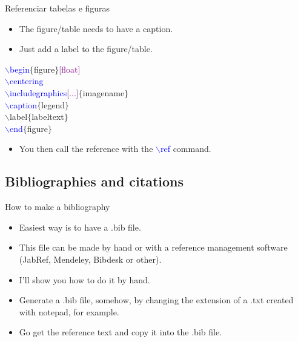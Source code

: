 \documentclass[usenames,dvipsnames,aspectratio=169]{beamer}
\newcommand{\aitem}{\item[$\cdot$]}
\begin{document}

\begin{frame}[t]{Referenciar tabelas e figuras}
\begin{itemize}
\aitem The figure/table needs to have a caption.
\aitem Just add a label to the figure/table.
\end{itemize}
\textcolor{blue}{$\backslash$begin}\textcolor{PineGreen}{$\{$figure$\}$}\textcolor{purple}{[float]}\\
\textcolor{blue}{$\backslash$centering}\\
\textcolor{blue}{$\backslash$includegraphics}\textcolor{purple}{[...]}\textcolor{PineGreen}{$\{$imagename$\}$}\\
\textcolor{blue}{$\backslash$caption}\textcolor{PineGreen}{$\{$legend$\}$}\\
\textcolor{YellowOrange}{$\backslash$label$\{$labeltext$\}$}\\
\textcolor{blue}{$\backslash$end}\textcolor{PineGreen}{$\{$figure$\}$}
\begin{itemize}
\aitem You then call the reference with the \textcolor{blue}{$\backslash$ref} command.
\end{itemize}
\end{frame}


%

\subsection{Bibliographies and citations}
\begin{frame}[t]{How to make a bibliography}
\begin{itemize}
\aitem Easiest way is to have a .bib file.
\aitem This file can be made by hand or with a reference management software (JabRef, Mendeley, Bibdesk or other).
\aitem I'll show you how to do it by hand.
\aitem Generate a .bib file, somehow, by changing the extension of a .txt  created with notepad, for example.
\aitem Go get the reference text and copy it into the .bib file.
\end{itemize}
\end{frame}
\end{document}
